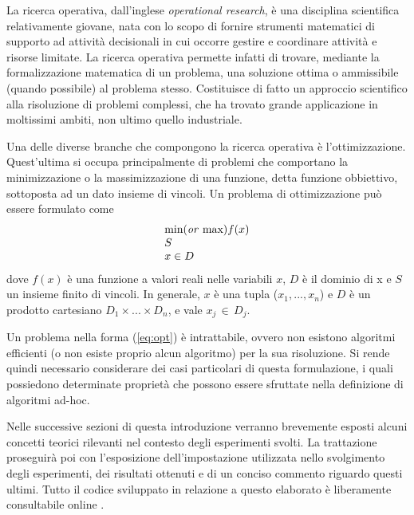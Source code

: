 La ricerca operativa, dall'inglese \textit{operational research}, è una disciplina scientifica relativamente 
giovane, nata con lo scopo di fornire strumenti matematici di supporto ad attività decisionali in cui occorre gestire e coordinare 
attività e risorse limitate. La ricerca operativa permette infatti di trovare, mediante la formalizzazione 
matematica di un problema, una soluzione ottima o ammissibile (quando possibile) al problema stesso. 
Costituisce di fatto un approccio scientifico alla risoluzione di problemi 
complessi, che ha trovato grande applicazione in moltissimi ambiti, non ultimo quello industriale. 

Una delle diverse branche che compongono la ricerca operativa è l'ottimizzazione. 
Quest'ultima si occupa principalmente di problemi che comportano la minimizzazione o la massimizzazione di una funzione, detta funzione
obbiettivo, sottoposta ad un dato insieme di vincoli. 
Un problema di ottimizzazione può essere formulato come 
\begin{align}
	\label{eq:opt}
	\begin{array}{l}
      \text{min(\textit{or} max)}f(x)\\
      S	\\
      x \in D
    \end{array}
\end{align}
dove $f(x)$ è una funzione a valori reali nelle variabili $x$, $D$ è il dominio di x e $S$ un insieme finito di vincoli. In generale,  
$x$ è una tupla ($x_1,...,x_n$) e $D$ è un prodotto cartesiano $D_1 \times ... \times D_n$, e vale $x_j \, \in \, D_j$. 

Un problema nella forma (\ref{eq:opt}) è intrattabile, ovvero non esistono algoritmi efficienti (o non esiste proprio
alcun algoritmo) per la sua risoluzione. Si rende quindi necessario considerare dei casi particolari di questa formulazione, i quali 
possiedono determinate proprietà che possono essere sfruttate nella definizione di algoritmi ad-hoc.
\newpage

Nelle successive sezioni di questa introduzione verranno brevemente esposti alcuni concetti teorici rilevanti nel contesto degli 
esperimenti svolti. La trattazione proseguirà poi con l'esposizione dell'impostazione utilizzata nello svolgimento degli
esperimenti, dei risultati ottenuti e di un conciso commento riguardo questi ultimi. Tutto il codice sviluppato in relazione a questo elaborato è liberamente consultabile online \cite{repository}.

